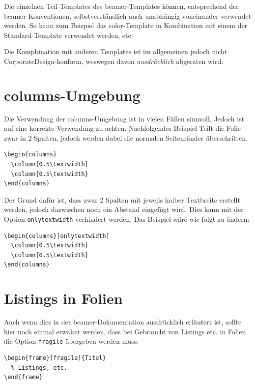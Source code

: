 \documentclass[cmyk,a4paper,colorscheme=green,TUBStitlepage=picture]{tubsreprt}
\begin{document}
Die einzelnen Teil-Templates des beamer-Templates können,
entsprechend der beamer-Konventionen, selbstverständlich
auch unabhängig voneinander verwendet werden.
So kann zum Beispiel das color-Template in Kombination mit einem der
Standard-Template verwendet werden, etc.

Die Kompbination mit anderen Templates ist im allgemeinen jedoch nicht
CorporateDesign-konform, weswegen davon \emph{ausdrücklich} abgeraten wird.

\section{columns-Umgebung}

Die Verwendung der columns-Umgebung ist in vielen Fällen sinnvoll.
Jedoch ist auf eine korrekte Verwendung zu achten.
Nachfolgendes Beispiel Teilt die Folie zwar in 2 Spalten,
jedoch werden dabei die normalen Seitenränder überschritten.

\begin{lstlisting}
\begin{columns}
  \column{0.5\textwidth}
  \column{0.5\textwidth}
\end{columns}
\end{lstlisting}

Der Grund dafür ist, dass zwar 2 Spalten mit jeweils halber Textbreite erstellt
werden, jedoch dazwischen noch ein Abstand eingefügt wird. Dies kann mit der
Option \lstinline{onlytextwidth} verhindert werden.
Das Beispiel wäre wie folgt zu ändern:

\begin{lstlisting}[morekeywords={onlytextwidth},keywordstyle=\color{tuOrange}]
\begin{columns}[onlytextwidth]
  \column{0.5\textwidth}
  \column{0.5\textwidth}
\end{columns}
\end{lstlisting}


\section{Listings in Folien}

Auch wenn dies in der beamer-Dokumentation ausdrücklich erläutert ist,
sollte hier noch einmal erwähnt werden, dass bei Gebraucht von Listings etc.
in Folien die Option \lstinline{fragile} übergeben werden muss.

\begin{lstlisting}
\begin{frame}[fragile]{Titel}
  % Listings, etc.
\end{frame}
\end{lstlisting}
\end{document}
